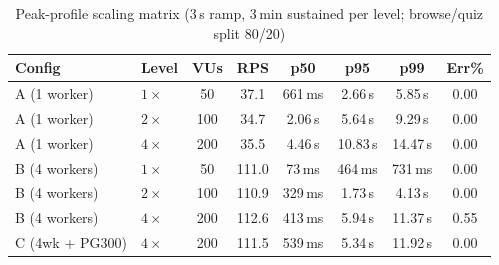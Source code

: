 \begin{table}[htbp]
\centering
\caption{Peak-profile scaling matrix (3\,s ramp, 3\,min sustained per level; browse/quiz split 80/20)}
\label{tab:k6_scaling}
\renewcommand{\arraystretch}{1.3}
\begin{tabular}{|l|l|c|c|c|c|c|c|}
\hline
\textbf{Config} & \textbf{Level} & \textbf{VUs} & \textbf{RPS} & \textbf{p50} & \textbf{p95} & \textbf{p99} & \textbf{Err\%} \\
\hline
A (1 worker)    & $1\times$ & 50  & 37.1  & 661\,ms & 2.66\,s & 5.85\,s  & 0.00 \\
A (1 worker)    & $2\times$ & 100 & 34.7  & 2.06\,s & 5.64\,s & 9.29\,s  & 0.00 \\
A (1 worker)    & $4\times$ & 200 & 35.5  & 4.46\,s & 10.83\,s & 14.47\,s & 0.00 \\
\hline
B (4 workers)   & $1\times$ & 50  & 111.0 & 73\,ms  & 464\,ms & 731\,ms  & 0.00 \\
B (4 workers)   & $2\times$ & 100 & 110.9 & 329\,ms & 1.73\,s & 4.13\,s  & 0.00 \\
B (4 workers)   & $4\times$ & 200 & 112.6 & 413\,ms & 5.94\,s & 11.37\,s & 0.55 \\
\hline
C (4wk + PG300) & $4\times$ & 200 & 111.5 & 539\,ms & 5.34\,s & 11.92\,s & 0.00 \\
\hline
\end{tabular}
\end{table}

